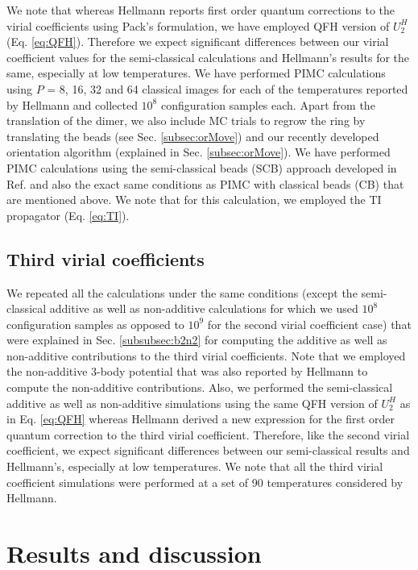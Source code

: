         We note that whereas Hellmann reports first order quantum corrections to the virial coefficients using Pack's \cite{Pack1983} formulation, we have employed QFH version of $U_2^H$ (Eq. \eqref{eq:QFH}). Therefore we expect significant differences between our virial coefficient values for the semi-classical calculations and Hellmann's results for the same, especially at low temperatures. We have performed PIMC calculations using $P$ = 8, 16, 32 and 64 classical images for each of the temperatures reported by Hellmann and collected $10^8$ configuration samples each. Apart from the translation of the dimer, we also include MC trials to regrow the ring by translating the beads (see Sec. \ref{subsec:orMove}) and our recently developed orientation algorithm \cite{hydrogen} (explained in Sec. \ref{subsec:orMove}).
        \ifSCB
            We have performed PIMC calculations using the semi-classical beads (SCB) approach developed in Ref. \cite{Fomms2016} and also the exact same conditions as PIMC with classical beads (CB) that are mentioned above. We note that for this calculation, we employed the TI propagator (Eq. \eqref{eq:TI}).
        \fi

    \subsection{Third virial coefficients}
        We repeated all the calculations under the same conditions (except the semi-classical additive as well as non-additive calculations for which we used $10^8$ configuration samples as opposed to $10^9$ for the second virial coefficient case) that were explained in Sec. \ref{subsubsec:b2n2} for computing the additive as well as non-additive contributions to the third virial coefficients. Note that we employed the non-additive 3-body potential that was also reported by Hellmann \cite{Hellmann2013} to compute the non-additive contributions. Also, we performed the semi-classical additive as well as non-additive simulations using the same QFH version of $U_2^H$ as in Eq. \eqref{eq:QFH} whereas Hellmann derived a new expression for the first order quantum correction to the third virial coefficient. Therefore, like the second virial coefficient, we expect significant differences between our semi-classical results and Hellmann's, especially at low temperatures. We note that all the third virial coefficient simulations were performed at a set of 90 temperatures considered by Hellmann.
\section{Results and discussion}
